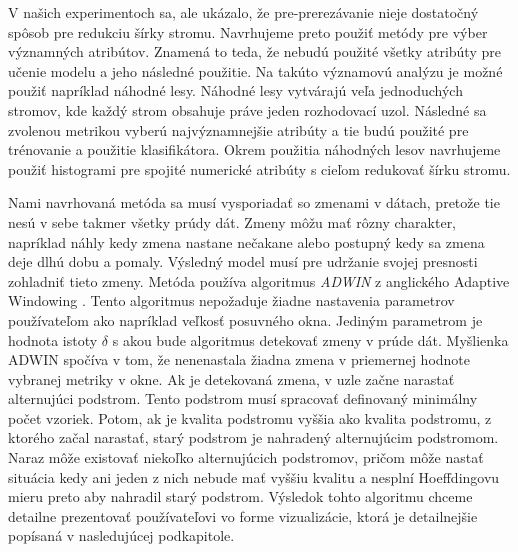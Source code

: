 \par
V našich experimentoch sa, ale ukázalo, že pre-prerezávanie nieje dostatočný spôsob pre redukciu šírky stromu. Navrhujeme preto použiť metódy pre výber významných atribútov. Znamená to teda, že nebudú použité všetky atribúty pre učenie modelu a jeho následné použitie. Na takúto významovú analýzu je možné použiť napríklad náhodné lesy. Náhodné lesy vytvárajú veľa jednoduchých stromov, kde každý strom obsahuje práve jeden rozhodovací uzol. Následné sa zvolenou metrikou vyberú najvýznamnejšie atribúty a tie budú použité pre trénovanie a použitie klasifikátora. Okrem použitia náhodných lesov navrhujeme použiť histogrami pre spojité numerické atribúty s cieľom redukovať šírku stromu.
\par
Nami navrhovaná metóda sa musí vysporiadať so zmenami v dátach, pretože tie nesú v sebe takmer všetky prúdy dát. Zmeny môžu mať rôzny charakter, napríklad náhly kedy zmena nastane nečakane alebo postupný kedy sa zmena deje dlhú dobu a pomaly. Výsledný model musí pre udržanie svojej presnosti zohladniť tieto zmeny. Metóda používa algoritmus \textit{ADWIN} z anglického Adaptive Windowing \citep{Hutchison2009}. Tento algoritmus nepožaduje žiadne nastavenia parametrov používateľom ako napríklad veľkosť posuvného okna. Jediným parametrom je hodnota istoty $\delta$ s akou bude algoritmus detekovať zmeny v prúde dát. Myšlienka ADWIN spočíva v tom, že nenenastala žiadna zmena v priemernej hodnote vybranej metriky v okne. Ak je detekovaná zmena, v uzle začne narastať alternujúci podstrom. Tento podstrom musí spracovať definovaný minimálny počet vzoriek. Potom, ak je kvalita podstromu vyššia ako kvalita podstromu, z ktorého začal narastať, starý podstrom je nahradený alternujúcim podstromom. Naraz môže existovať niekoľko alternujúcich podstromov, pričom môže nastať situácia kedy ani jeden z nich nebude mať vyššiu kvalitu a nesplní Hoeffdingovu mieru preto aby nahradil starý podstrom. Výsledok tohto algoritmu chceme detailne prezentovať používateľovi vo forme vizualizácie, ktorá je detailnejšie popísaná v nasledujúcej podkapitole. 




